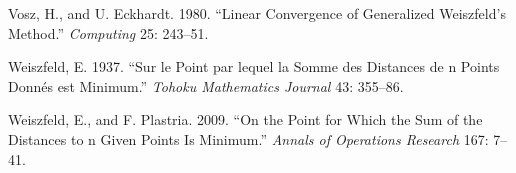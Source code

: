 \documentclass[
  12pt,
  letterpaper,
  DIV=11,
  numbers=noendperiod]{scrartcl}
\newlength{\cslhangindent}
\newenvironment{CSLReferences}[2] %
 {\begin{list}{}{%
  \setlength{\itemindent}{0pt}
  \setlength{\leftmargin}{0pt}
  \setlength{\parsep}{0pt}
  \ifodd #1
   \setlength{\leftmargin}{\cslhangindent}
   \setlength{\itemindent}{-1\cslhangindent}
  \fi
  \setlength{\itemsep}{#2\baselineskip}}}
 {\end{list}}
\theoremstyle{definition}
\theoremstyle{plain}
\theoremstyle{plain}
\theoremstyle{remark}
\begin{document}
\begin{CSLReferences}{1}{0}
Vosz, H., and U. Eckhardt. 1980. {``{Linear Convergence of Generalized
{W}eiszfeld's Method}.''} \emph{Computing} 25: 243--51.

Weiszfeld, E. 1937. {``{Sur le Point par lequel la Somme des Distances
de n Points Donnés est Minimum}.''} \emph{Tohoku Mathematics Journal}
43: 355--86.

Weiszfeld, E., and F. Plastria. 2009. {``On the Point for Which the Sum
of the Distances to n Given Points Is Minimum.''} \emph{Annals of
Operations Research} 167: 7--41.

\end{CSLReferences}
\end{document}
